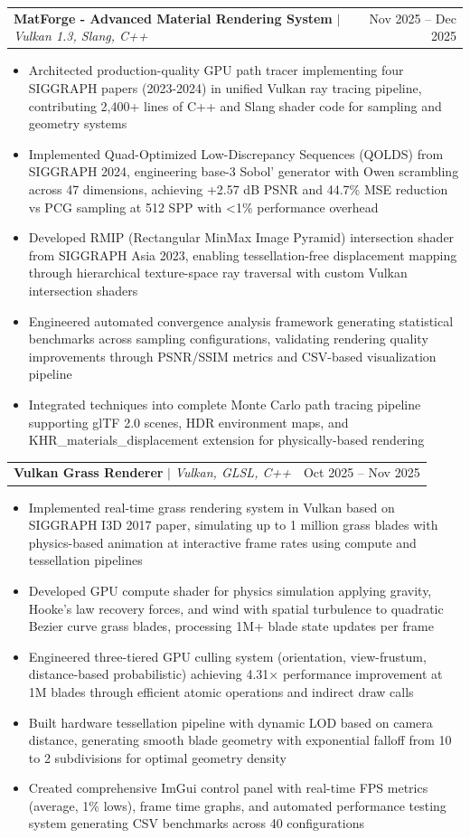 \documentclass[letterpaper,11pt]{article}
\makeatletter
\newcommand{\resumeItem}[1]{
  \item\small{
    {#1 \vspace{-3pt}}
  }
}
\newcommand{\resumeProjectHeading}[2]{
    \item
    \begin{tabular*}{0.97\textwidth}{l@{\extracolsep{\fill}}r}
      \small#1 & #2 \\
    \end{tabular*}\vspace{-7pt}
}
\newcommand{\resumeItemListStart}{\begin{itemize}}
\newcommand{\resumeItemListEnd}{\end{itemize}\vspace{-5pt}}
\makeatother
\begin{document}
    \resumeProjectHeading
          {\textbf{MatForge - Advanced Material Rendering System} $|$ \emph{Vulkan 1.3, Slang, C++}}{Nov 2025 -- Dec 2025}
          \resumeItemListStart
          \resumeItem{Architected production-quality GPU path tracer implementing four SIGGRAPH papers (2023-2024) in unified Vulkan ray tracing pipeline, contributing 2,400+ lines of C++ and Slang shader code for sampling and geometry systems}
          \resumeItem{Implemented Quad-Optimized Low-Discrepancy Sequences (QOLDS) from SIGGRAPH 2024, engineering base-3 Sobol' generator with Owen scrambling across 47 dimensions, achieving +2.57 dB PSNR and 44.7\% MSE reduction vs PCG sampling at 512 SPP with <1\% performance overhead}
          \resumeItem{Developed RMIP (Rectangular MinMax Image Pyramid) intersection shader from SIGGRAPH Asia 2023, enabling tessellation-free displacement mapping through hierarchical texture-space ray traversal with custom Vulkan intersection shaders}
          \resumeItem{Engineered automated convergence analysis framework generating statistical benchmarks across sampling configurations, validating rendering quality improvements through PSNR/SSIM metrics and CSV-based visualization pipeline}
          \resumeItem{Integrated techniques into complete Monte Carlo path tracing pipeline supporting glTF 2.0 scenes, HDR environment maps, and KHR\_materials\_displacement extension for physically-based rendering}
          \resumeItemListEnd

    \resumeProjectHeading
          {\textbf{Vulkan Grass Renderer} $|$ \emph{Vulkan, GLSL, C++}}{Oct 2025 -- Nov 2025}
          \resumeItemListStart
          \resumeItem{Implemented real-time grass rendering system in Vulkan based on SIGGRAPH I3D 2017 paper, simulating up to 1 million grass blades with physics-based animation at interactive frame rates using compute and tessellation pipelines}
          \resumeItem{Developed GPU compute shader for physics simulation applying gravity, Hooke's law recovery forces, and wind with spatial turbulence to quadratic Bezier curve grass blades, processing 1M+ blade state updates per frame}
          \resumeItem{Engineered three-tiered GPU culling system (orientation, view-frustum, distance-based probabilistic) achieving 4.31$\times$ performance improvement at 1M blades through efficient atomic operations and indirect draw calls}
          \resumeItem{Built hardware tessellation pipeline with dynamic LOD based on camera distance, generating smooth blade geometry with exponential falloff from 10 to 2 subdivisions for optimal geometry density}
          \resumeItem{Created comprehensive ImGui control panel with real-time FPS metrics (average, 1\% lows), frame time graphs, and automated performance testing system generating CSV benchmarks across 40 configurations}
          \resumeItemListEnd
\end{document}
